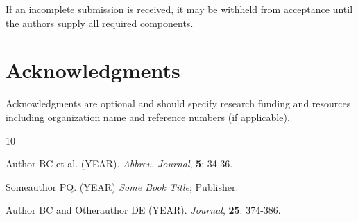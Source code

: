\documentclass[10pt,twocolumn,a4paper]{article}
\renewenvironment{thebibliography}[1]{
  \begin{oldthebibliography}{#1}
    \setlength{\itemsep}{0em}
    \setlength{\parskip}{0em}
}
{
  \end{oldthebibliography}
}
\begin{document}
If an incomplete submission is received, it may be withheld from acceptance until the authors supply all required components.

\section*{Acknowledgments}
Acknowledgments are optional and should specify research funding and resources including organization name and reference numbers (if applicable).





\begin{thebibliography}{10}
Author BC et al. 
\newblock (YEAR). 
\newblock \textit{Abbrev. Journal}, \textbf{5}: 34-36.

Someauthor PQ. (YEAR) 
\newblock \textit{Some Book Title}; Publisher.

Author BC and Otherauthor DE (YEAR). 
\newblock \textit{Journal}, \textbf{25}: 374-386.
\end{thebibliography}






\end{document}
